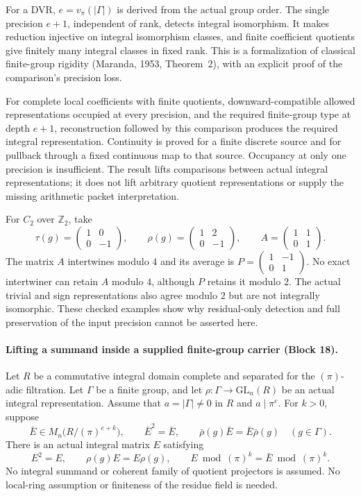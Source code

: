 \documentclass[11pt]{article}
\theoremstyle{definition}
\theoremstyle{remark}
\begin{document}
For a DVR, $e=v_\pi(|\Gamma|)$ is derived from the actual group order.
The single precision $e+1$, independent of rank, detects integral
isomorphism. It makes reduction injective on integral isomorphism classes,
and finite coefficient quotients give finitely many integral classes in
fixed rank. This is a formalization of classical finite-group rigidity
(Maranda, 1953, Theorem~2), with an explicit proof of the comparison's
precision loss.

For complete local coefficients with finite quotients, downward-compatible
allowed representations occupied at every precision, and the required
finite-group type at depth $e+1$, reconstruction followed by this comparison
produces the required integral representation. Continuity is proved for a
finite discrete source and for pullback through a fixed continuous map to
that source. Occupancy at only one precision is insufficient. The result
lifts comparisons between actual integral representations; it does not lift
arbitrary quotient representations or supply the missing arithmetic packet
interpretation.

For $C_2$ over $\mathbb Z_2$, take
\[
\tau(g)=\begin{pmatrix}1&0\\0&-1\end{pmatrix},\qquad
\rho(g)=\begin{pmatrix}1&2\\0&-1\end{pmatrix},\qquad
A=\begin{pmatrix}1&1\\0&1\end{pmatrix}.
\]
The matrix $A$ intertwines modulo $4$ and its average is
$P=\left(\begin{smallmatrix}1&-1\\0&1\end{smallmatrix}\right)$.
No exact intertwiner can retain $A$ modulo $4$, although $P$ retains it
modulo $2$. The actual trivial and sign representations also agree modulo
$2$ but are not integrally isomorphic. These checked examples show why
residual-only detection and full preservation of the input precision cannot
be asserted here.


\paragraph{Lifting a summand inside a supplied finite-group carrier (Block 18).}
Let $R$ be a commutative integral domain complete and separated for the
$(\pi)$-adic filtration. Let $\Gamma$ be a finite group, and let
$\rho:\Gamma\to\mathrm{GL}_n(R)$ be an actual integral representation.
Assume that $a=|\Gamma|\ne0$ in $R$ and $a\mid\pi^e$. For $k>0$, suppose
\[
\bar E\in M_n\bigl(R/(\pi)^{e+k}\bigr),\qquad
\bar E^2=\bar E,\qquad
\bar\rho(g)\bar E=\bar E\bar\rho(g)\quad(g\in\Gamma).
\]
There is an actual integral matrix $E$ satisfying
\[
E^2=E,\qquad \rho(g)E=E\rho(g),\qquad
E\bmod(\pi)^k=\bar E\bmod(\pi)^k.
\]
No integral summand or coherent family of quotient projectors is assumed.
No local-ring assumption or finiteness of the residue field is needed.
\end{document}
